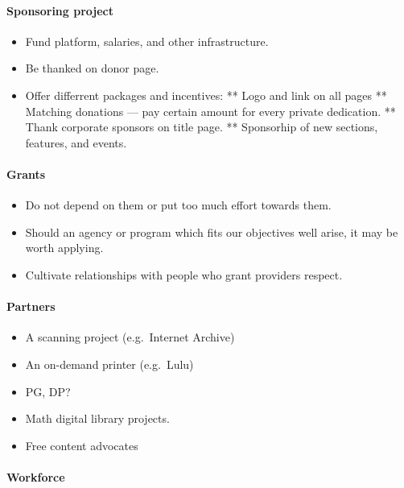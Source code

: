 \paragraph{Sponsoring project}

\begin{itemize}
\item
  Fund platform, salaries, and other infrastructure.
\item
  Be thanked on donor page.
\item
  Offer differrent packages and incentives: ** Logo and link on all
  pages ** Matching donations --- pay certain amount for every private
  dedication. ** Thank corporate sponsors on title page. ** Sponsorhip
  of new sections, features, and events.
\end{itemize}

\paragraph{Grants}

\begin{itemize}
\item
  Do not depend on them or put too much effort towards them.
\item
  Should an agency or program which fits our objectives well arise, it
  may be worth applying.
\item
  Cultivate relationships with people who grant providers respect.
\end{itemize}

\paragraph{Partners}

\begin{itemize}
\item
  A scanning project (e.g.~Internet Archive)
\item
  An on-demand printer (e.g.~Lulu)
\item
  PG, DP?
\item
  Math digital library projects.
\item
  Free content advocates
\end{itemize}

\paragraph{Workforce}

